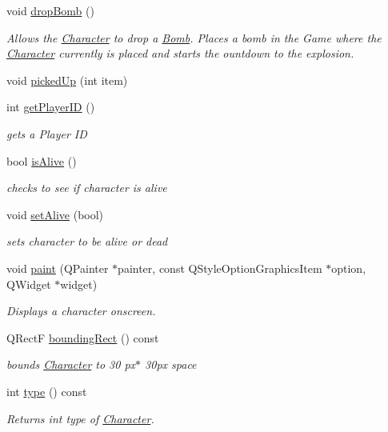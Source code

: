 \begin{DoxyCompactItemize}
void \hyperlink{class_character_a38747fb2a1e186e6cc871f0836eb83e8}{drop\-Bomb} ()
\begin{DoxyCompactList}\small\item\em Allows the \hyperlink{class_character}{Character} to drop a \hyperlink{class_bomb}{Bomb}. Places a bomb in the Game where the \hyperlink{class_character}{Character} currently is placed and starts the ountdown to the explosion. \end{DoxyCompactList}\item 
void \hyperlink{class_character_acb99685904de8dce448ad8a51efed7cb}{picked\-Up} (int item)
\item 
int \hyperlink{class_character_aacb2a15ce71f1165daceb29cf481a4cb}{get\-Player\-I\-D} ()
\begin{DoxyCompactList}\small\item\em gets a Player I\-D \end{DoxyCompactList}\item 
bool \hyperlink{class_character_aa49f985b1b05751b2d4b3de74b4acc8c}{is\-Alive} ()
\begin{DoxyCompactList}\small\item\em checks to see if character is alive \end{DoxyCompactList}\item 
void \hyperlink{class_character_a86b2dbfe674fa8d1b99c84a265afb3e2}{set\-Alive} (bool)
\begin{DoxyCompactList}\small\item\em sets character to be alive or dead \end{DoxyCompactList}\item 
void \hyperlink{class_character_a099916c7331625461d7cd976ec4b0498}{paint} (Q\-Painter $\ast$painter, const Q\-Style\-Option\-Graphics\-Item $\ast$option, Q\-Widget $\ast$widget)
\begin{DoxyCompactList}\small\item\em Displays a character onscreen. \end{DoxyCompactList}\item 
Q\-Rect\-F \hyperlink{class_character_af3bf8c7fe7ddbad47b54193374d25ee2}{bounding\-Rect} () const 
\begin{DoxyCompactList}\small\item\em bounds \hyperlink{class_character}{Character} to 30 px$\ast$ 30px space \end{DoxyCompactList}\item 
int \hyperlink{class_character_aba58d60bcfe61c1807e1a9e9439b56f0}{type} () const 
\begin{DoxyCompactList}\small\item\em Returns int type of \hyperlink{class_character}{Character}. \end{DoxyCompactList}\end{DoxyCompactItemize}


